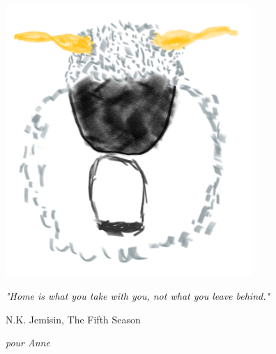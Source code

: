 \thispagestyle{empty}
\cleardoublepage
\thispagestyle{empty}
\setlength{\epigraphwidth}{0.9\textwidth}
\setlength\epigraphrule{0pt}
\renewcommand {\sourceflush} {center}

\null{}
\hfill%
\begin{center}
\includegraphics[width=0.7\textwidth]{0_cover/maeh.png}
\end{center}
\vspace{1cm}
\epigraph{
    \textit{
        "Home is what you take with you, not what you leave behind."
    }
}
{
    N.K. Jemisin, The Fifth Season
}

\vspace{0.5cm}

\begin{center}
\textit{pour Anne}
\end{center}

\clearpage{ \thispagestyle{empty} \cleardoublepage}

\setlength{\epigraphwidth}{0.55\textwidth}
